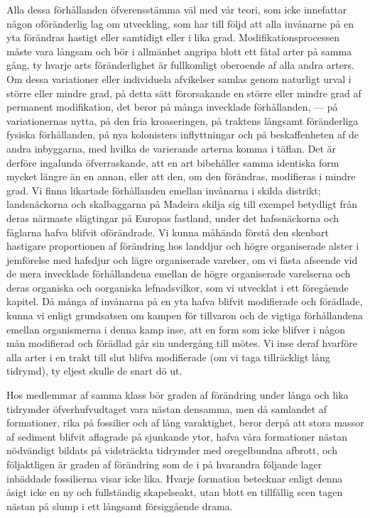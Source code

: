 Alla dessa förhållanden öfverensstämma väl med vår teori, som icke innefattar någon oföränderlig lag om utveckling, som har till följd att alla invånarne på en yta förändras hastigt eller samtidigt eller i lika grad. Modifikationsprocessen måste vara långsam och bör i allmänhet angripa blott ett fåtal arter på samma gång, ty hvarje arts föränderlighet är fullkomligt oberoende af alla andra arters. Om dessa variationer eller individuela afvikelser samlas genom naturligt urval i större eller mindre grad, på detta sätt förorsakande en större eller mindre grad af permanent modifikation, det beror på många invecklade förhållanden, — på variationernas nytta, på den fria kroaseringen, på traktens långsamt föränderliga fysiska förhållanden, på nya kolonisters inflyttningar och på beskaffenheten af de andra inbyggarna, med hvilka de varierande arterna komma i täflan. Det är derföre ingalunda öfverraskande, att en art bibehåller samma identiska form mycket längre än en annan, eller att den, om den förändras, modifieras i mindre grad. Vi finna likartade förhållanden emellan invånarna i skilda distrikt; landsnäckorna och skalbaggarna på Madeira skilja sig till exempel betydligt från deras närmaste slägtingar på Europas fastland, under det hafssnäckorna och fåglarna hafva blifvit oförändrade. Vi kunna måhända förstå den skenbart hastigare proportionen af förändring hos landdjur och högre organiserade alster i jemförelse med hafsdjur och lägre organiserade varelser, om vi fästa afseende vid de mera invecklade förhållandena emellan de högre organiserade varelserna och deras organiska och oorganiska lefnadsvilkor, som vi utvecklat i ett föregående kapitel. Då många af invånarna på en yta hafva blifvit modifierade och förädlade, kunna vi enligt grundsatsen om kampen för tillvaron och de vigtiga förhållandena emellan organismerna i denna kamp inse, att en form som icke blifver i någon mån modifierad och förädlad går sin undergång till mötes. Vi inse deraf hvarföre alla arter i en trakt till slut blifva modifierade (om vi taga tillräckligt lång tidrymd), ty eljest skulle de snart dö ut.

Hos medlemmar af samma klass bör graden af förändring under långa och lika tidrymder öfverhufvudtaget vara nästan densamma, men då samlandet af formationer, rika på fossilier och af lång varaktighet, beror derpå att stora massor af sediment blifvit aflagrade på sjunkande ytor, hafva våra formationer nästan nödvändigt bildats på vidsträckta tidrymder med oregelbundna afbrott, och följaktligen är graden af förändring som de i på hvarandra följande lager inbäddade fossilierna visar icke lika. Hvarje formation betecknar enligt denna åsigt icke en ny och fullständig skapelseakt, utan blott en tillfällig scen tagen nästan på slump i ett långsamt försiggående drama.

